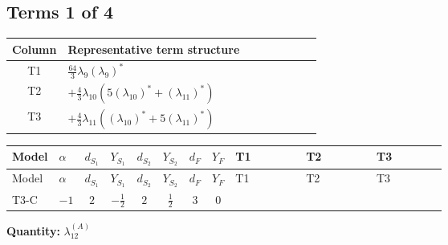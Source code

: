 \documentclass[8pt]{article}
\begin{document}
\begin{landscape}
\subsection*{Terms 1 of 4}
\begin{center}
\begin{tabular}{@{}c >{\raggedright\arraybackslash}p{0.82\linewidth}@{}}
\toprule
Column & Representative term structure \\
\midrule
T1 & \(\displaystyle \frac{64}{3} {\lambda_{9}} \left({\lambda_{9}}\right)^{*}\) \\
\midrule
T2 & \(\displaystyle +\frac{4}{3} {\lambda_{10}} (5 \left({\lambda_{10}}\right)^{*}+\left({\lambda_{11}}\right)^{*})\) \\
\midrule
T3 & \(\displaystyle +\frac{4}{3} {\lambda_{11}} (\left({\lambda_{10}}\right)^{*}+5 \left({\lambda_{11}}\right)^{*})\) \\
\midrule
\bottomrule
\end{tabular}
\end{center}
\smallskip
\tiny
\begin{longtable}{@{}llcccccc >{\raggedright\arraybackslash}p{0.21\linewidth} >{\raggedright\arraybackslash}p{0.21\linewidth} >{\raggedright\arraybackslash}p{0.21\linewidth}@{}}
\toprule
Model & $\alpha$ & $d_{S_1}$ & $Y_{S_1}$ & $d_{S_2}$ & $Y_{S_2}$ & $d_F$ & $Y_F$ & T1 & T2 & T3 \\
\midrule
\endfirsthead
\toprule
Model & $\alpha$ & $d_{S_1}$ & $Y_{S_1}$ & $d_{S_2}$ & $Y_{S_2}$ & $d_F$ & $Y_F$ & T1 & T2 & T3 \\
\midrule
\endhead
T3-C & $-1$ & $2$ & $-\frac{1}{2}$ & $2$ & $\frac{1}{2}$ & $3$ & $0$ & \scriptsize\adjustbox{max width=\linewidth}{$\begin{gathered} \frac{64}{3} {\lambda_{9}} \left({\lambda_{9}}\right)^{*}\end{gathered}$} & \scriptsize\adjustbox{max width=\linewidth}{$\begin{gathered} +\frac{4}{3} {\lambda_{10}} (5 \left({\lambda_{10}}\right)^{*}+\left({\lambda_{11}}\right)^{*})\end{gathered}$} & \scriptsize\adjustbox{max width=\linewidth}{$\begin{gathered} +\frac{4}{3} {\lambda_{11}} (\left({\lambda_{10}}\right)^{*}+5 \left({\lambda_{11}}\right)^{*})\end{gathered}$} \\
\midrule
\bottomrule
\end{longtable}
\clearpage
\noindent\textbf{Quantity: }$\lambda_{12}^{(A)}$\par\smallskip

\end{landscape}
\end{document}
